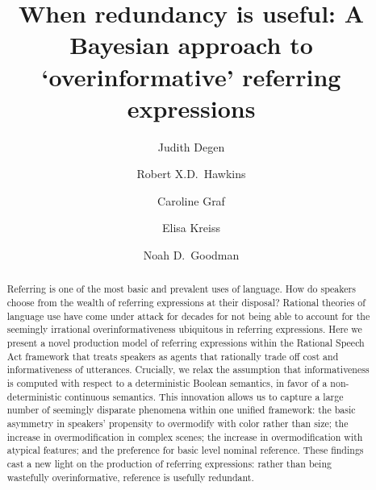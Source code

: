 \documentclass[11pt]{article}
\title{When redundancy is useful: A Bayesian approach to `overinformative' referring expressions}
\author[$\bullet$]{Judith Degen}
\author[$\bullet$]{Robert X.D.~Hawkins}
\author[$\triangleright$]{Caroline Graf}
\author[$\bullet$]{Elisa Kreiss}
\author[$\bullet$]{Noah D.~Goodman}
\affil[$\bullet$]{Stanford University}
\affil[$\triangleright$]{Freie Universit\"at Berlin}
\begin{document}
\maketitle
\thispagestyle{firststyle}

\pagebreak

\pagestyle{mainstyle}
%

\begin{abstract}
Referring is one of the most basic and prevalent uses of language. How do speakers choose from the wealth of referring expressions at their disposal? Rational theories of language use have come under attack for decades for not being able to account for the seemingly irrational overinformativeness ubiquitous in referring expressions. Here we present a novel production model of referring expressions within the Rational Speech Act framework that treats speakers as agents that rationally trade off cost and informativeness of utterances. Crucially, we relax the assumption that informativeness is computed with respect to a deterministic Boolean semantics, in favor of a non-deterministic continuous semantics. This innovation allows us to capture a large number of seemingly disparate phenomena within one unified framework: the basic asymmetry in speakers' propensity to overmodify with color rather than size; the increase in overmodification in complex scenes; the increase in overmodification with atypical features; and the preference for basic level nominal reference. These findings cast a new light on the production of referring expressions: rather than being wastefully overinformative, reference is usefully redundant. 
\end{abstract}
\end{document}
